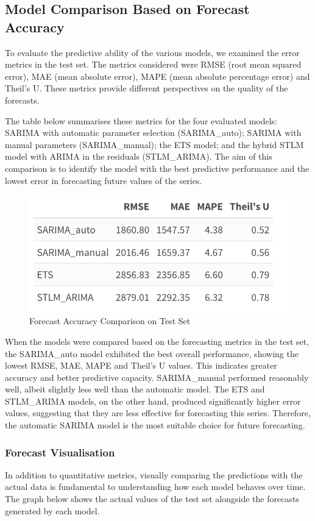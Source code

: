 \subsection{Model Comparison Based on Forecast Accuracy}
To evaluate the predictive ability of the various models, we examined the error metrics in the test set. The metrics considered were RMSE (root mean squared error), MAE (mean absolute error), MAPE (mean absolute percentage error) and Theil's U. These metrics provide different perspectives on the quality of the forecasts.

The table below summarises these metrics for the four evaluated models: SARIMA with automatic parameter selection (SARIMA\_auto); SARIMA with manual parameters (SARIMA\_manual); the ETS model; and the hybrid STLM model with ARIMA in the residuals (STLM\_ARIMA). The aim of this comparison is to identify the model with the best predictive performance and the lowest error in forecasting future values of the series.

\begin{figure}[H]
    \centering
    \includegraphics[width=0.75\linewidth]{images/table2.png}
    \caption{Forecast Accuracy Comparison on Test Set}
    \label{fig:enter-label}
\end{figure}

When the models were compared based on the forecasting metrics in the test set, the SARIMA\_auto model exhibited the best overall performance, showing the lowest RMSE, MAE, MAPE and Theil's U values. This indicates greater accuracy and better predictive capacity. SARIMA\_manual performed reasonably well, albeit slightly less well than the automatic model. The ETS and STLM\_ARIMA models, on the other hand, produced significantly higher error values, suggesting that they are less effective for forecasting this series. Therefore, the automatic SARIMA model is the most suitable choice for future forecasting.

\subsubsection{Forecast Visualisation}
In addition to quantitative metrics, visually comparing the predictions with the actual data is fundamental to understanding how each model behaves over time. The graph below shows the actual values of the test set alongside the forecasts generated by each model.

